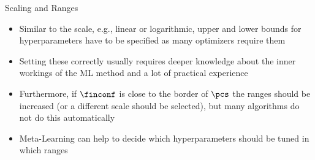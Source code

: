 \begin{frame}[allowframebreaks]{Scaling and Ranges}
\begin{figure}[htb]
\end{figure}

\framebreak

    \begin{itemize}
        \item Similar to the scale, e.g., linear or logarithmic, upper and lower bounds for hyperparameters have to be specified as many optimizers require them
        \item Setting these correctly usually requires deeper knowledge about the inner workings of the ML method and a lot of practical experience
        \item Furthermore, if $\finconf$ is close to the border of $\pcs$ the ranges should be increased (or a different scale should be selected), but many algorithms do not do this automatically
        \item Meta-Learning can help to decide which hyperparameters should be tuned in which ranges
    \end{itemize}

\end{frame}

